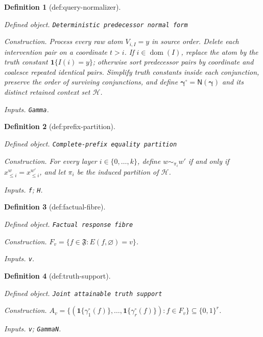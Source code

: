 \documentclass{article}
\newtheorem{definition}{Definition}
\begin{document}
\begin{definition}[def:query-normalizer]\label{def:query-normalizer}
\par\smallskip\noindent\emph{Defined object.} \texttt{Deterministic predecessor normal form}
\par\smallskip\noindent\emph{Construction.} Process every raw atom \(V_{i,I}=y\) in source order. Delete each intervention pair on a coordinate \(t>i\). If \(i\in\operatorname{dom}(I)\), replace the atom by the truth constant \(\mathbf 1\{I(i)=y\}\); otherwise sort predecessor pairs by coordinate and coalesce repeated identical pairs. Simplify truth constants inside each conjunction, preserve the order of surviving conjunctions, and define \(\boldsymbol\gamma^{\circ}=\mathsf N(\boldsymbol\gamma)\) and its distinct retained context set \(\mathcal H\).
\par\smallskip\noindent\emph{Inputs.} \texttt{Gamma}.
\end{definition}

\begin{definition}[def:prefix-partition]\label{def:prefix-partition}
\par\smallskip\noindent\emph{Defined object.} \texttt{Complete-\allowbreak{}prefix equality partition}
\par\smallskip\noindent\emph{Construction.} For every layer \(i\in\{0,\ldots,k\}\), define \(w\sim_{\pi_i}w'\) if and only if \(x^w_{\leq i}=x^{w'}_{\leq i}\), and let \(\pi_i\) be the induced partition of \(\mathcal H\).
\par\smallskip\noindent\emph{Inputs.} \texttt{f}; \texttt{H}.
\end{definition}

\begin{definition}[def:factual-fibre]\label{def:factual-fibre}
\par\smallskip\noindent\emph{Defined object.} \texttt{Factual response fibre}
\par\smallskip\noindent\emph{Construction.} \(F_v=\{f\in\mathfrak F:E(f,\varnothing)=v\}\).
\par\smallskip\noindent\emph{Inputs.} \texttt{v}.
\end{definition}

\begin{definition}[def:truth-support]\label{def:truth-support}
\par\smallskip\noindent\emph{Defined object.} \texttt{Joint attainable truth support}
\par\smallskip\noindent\emph{Construction.} \(A_v=\{(\mathbf 1\{\gamma_1^{\circ}(f)\},\ldots,\mathbf 1\{\gamma_r^{\circ}(f)\}):f\in F_v\}\subseteq\{0,1\}^r\).
\par\smallskip\noindent\emph{Inputs.} \texttt{v}; \texttt{GammaN}.
\end{definition}
\end{document}
